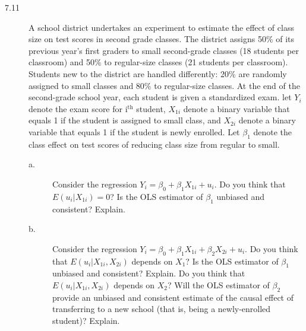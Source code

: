 \documentclass[a4paper,11pt]{article}
\begin{document}
\begin{description}
\item[{7.11}] A school district undertakes an experiment to estimate the
effect of class size on test scores in second grade
classes. The district assigns 50\% of its previous year's
first graders to small second-grade classes (18 students per
classroom) and 50\% to regular-size classes (21 students per
classroom). Students new to the district are handled
differently: 20\% are randomly assigned to small classes and
80\% to regular-size classes. At the end of the second-grade
school year, each student is given a standardized exam. let
\(Y_i\) denote the exam score for i\(^{\text{th}}\) student, \(X_{1i}\)
denote a binary variable that equals 1 if the student is
assigned to small class, and \(X_{2i}\) denote a binary
variable that equals 1 if the student is newly enrolled. Let
\(\beta_1\) denote the class effect on test scores of reducing
class size from regular to small.
\begin{description}
\item[{a.}] Consider the regression \(Y_i = \beta_0 + \beta_1 X_{1i} +
          u_i\). Do you think that \(E(u_i | X_{1i}) = 0\)? Is the OLS
estimator of \(\beta_1\) unbiased and consistent? Explain.
\item[{b.}] Consider the regression \(Y_i = \beta_0 + \beta_1 X_{1i} +
          \beta_2 X_{2i} + u_i\). Do you think that \(E(u_i | X_{1i},
          X_{2i})\) depends on \(X_1\)? Is the OLS estimator of \(\beta_{\text{1}}\)
unbiased and consistent? Explain. Do you think that \(E(u_i |
          X_{1i}, X_{2i})\) depends on \(X_2\)? Will the OLS estimator of
\(\beta_{\text{2}}\) provide an unbiased and consistent estimate of the
causal effect of transferring to a new school (that is,
being a newly-enrolled student)? Explain.
\end{description}
\end{description}
\end{document}
